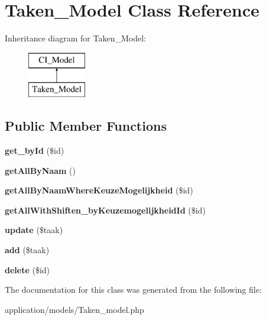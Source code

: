 \hypertarget{class_taken___model}{}\section{Taken\+\_\+\+Model Class Reference}
\label{class_taken___model}
Inheritance diagram for Taken\+\_\+\+Model\+:\begin{figure}[H]
\begin{center}
\leavevmode
\includegraphics[height=2.000000cm]{class_taken___model}
\end{center}
\end{figure}
\subsection*{Public Member Functions}
\begin{DoxyCompactItemize}
\item 
\mbox{\label{class_taken___model_a98d28a4d9a29d40c5a8aa0176f19a919}} 
{\bfseries get\+\_\+by\+Id} (\$id)
\item 
\mbox{\label{class_taken___model_a2b035b1ffd1cbe651b35bb3e53d72c09}} 
{\bfseries get\+All\+By\+Naam} ()
\item 
\mbox{\label{class_taken___model_a6f3e4d26ab480501524eabb01683f5f7}} 
{\bfseries get\+All\+By\+Naam\+Where\+Keuze\+Mogelijkheid} (\$id)
\item 
\mbox{\label{class_taken___model_a43d1fa46aefbe64343373fac217d6bdb}} 
{\bfseries get\+All\+With\+Shiften\+\_\+by\+Keuzemogelijkheid\+Id} (\$id)
\item 
\mbox{\label{class_taken___model_a2fdc722cb2e60f87bc93a5f2390f88bc}} 
{\bfseries update} (\$taak)
\item 
\mbox{\label{class_taken___model_ab4986b088d8f7831b9a8dce8e97485bb}} 
{\bfseries add} (\$taak)
\item 
\mbox{\label{class_taken___model_a2f8258add505482d7f00ea26493a5723}} 
{\bfseries delete} (\$id)
\end{DoxyCompactItemize}


The documentation for this class was generated from the following file\+:\begin{DoxyCompactItemize}
\item 
application/models/Taken\+\_\+model.\+php\end{DoxyCompactItemize}
